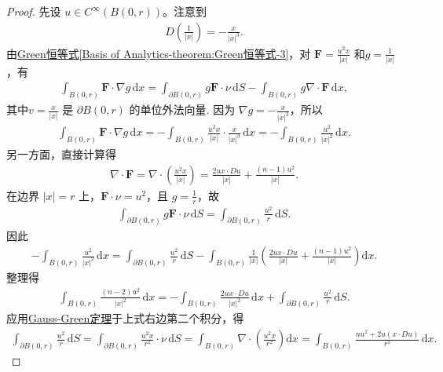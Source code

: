 \documentclass[../../main.tex]{subfiles}
\begin{document}
\begin{proof}
先设 $u\in C^\infty(B(0,r))$。注意到
\begin{align*}
D\left(\frac{1}{|x|}\right) = -\frac{x}{|x|^3}.
\end{align*}
由\hyperref[Basis of Analytics-theorem:Green恒等式]{Green恒等式\ref{Basis of Analytics-theorem:Green恒等式-3}}，对 $\bm{F} = \frac{u^2 x}{|x|}$ 和$g = \frac{1}{|x|}$，有
\begin{align*}
\int_{B(0,r)} \bm{F}\cdot \nabla g \,\mathrm{d}x
= \int_{\partial B(0,r)} g \bm{F}\cdot \nu \,\mathrm{d}S - \int_{B(0,r)} g \nabla\cdot \bm{F} \,\mathrm{d}x,
\end{align*}
其中$v=\frac{x}{|x|}$ 是 $\partial B(0,r)$ 的单位外法向量.
因为 $\nabla g = -\frac{x}{|x|^3}$，所以
\begin{align*}
\int_{B(0,r)} \bm{F}\cdot \nabla g \,\mathrm{d}x
= -\int_{B(0,r)} \frac{u^2 x}{|x|}\cdot \frac{x}{|x|^3} \,\mathrm{d}x
= -\int_{B(0,r)} \frac{u^2}{|x|^2} \,\mathrm{d}x.
\end{align*}
另一方面，直接计算得
\begin{align*}
\nabla\cdot \bm{F}
= \nabla\cdot \left( \frac{u^2 x}{|x|} \right)
= \frac{2u x\cdot Du}{|x|} + \frac{(n-1)u^2}{|x|}.
\end{align*}
在边界 $|x|=r$ 上，$\bm{F}\cdot \nu = u^2$，且 $g = \frac{1}{r}$，故
\begin{align*}
\int_{\partial B(0,r)} g \bm{F}\cdot \nu \,\mathrm{d}S
= \int_{\partial B(0,r)} \frac{u^2}{r} \,\mathrm{d}S.
\end{align*}
因此
\begin{align*}
-\int_{B(0,r)} \frac{u^2}{|x|^2} \,\mathrm{d}x
= \int_{\partial B(0,r)} \frac{u^2}{r} \,\mathrm{d}S
- \int_{B(0,r)} \frac{1}{|x|} \left( \frac{2u x\cdot Du}{|x|} + \frac{(n-1)u^2}{|x|} \right) \mathrm{d}x.
\end{align*}
整理得
\begin{align*}
\int_{B(0,r)} \frac{(n-2)u^2}{|x|^2} \,\mathrm{d}x
= -\int_{B(0,r)} \frac{2u x\cdot Du}{|x|^2} \,\mathrm{d}x
+ \int_{\partial B(0,r)} \frac{u^2}{r} \,\mathrm{d}S.
\end{align*}
应用\hyperref[Basis of Analytics-theorem:Gauss-Green公式(散度定理)]{Gauss-Green定理}于上式右边第二个积分，得
\begin{align}\label{eq:trace-18}
\int_{\partial B(0,r)} \frac{u^2}{r} \,\mathrm{d}S
= \int_{\partial B(0,r)} \frac{u^2 x}{r^2}\cdot \nu \,\mathrm{d}S
= \int_{B(0,r)} \nabla\cdot \left( \frac{u^2 x}{r^2} \right) \mathrm{d}x
= \int_{B(0,r)} \frac{n u^2 + 2u(x\cdot Du)}{r^2} \,\mathrm{d}x.

\end{align}
\end{proof}
\end{document}
